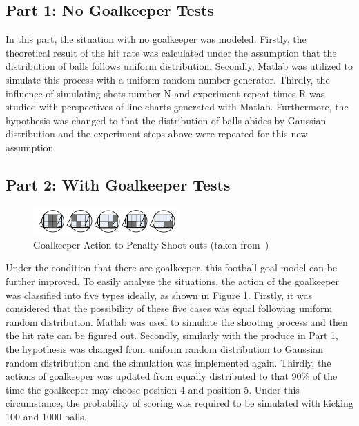 \documentclass[11pt, a4paper]{article}
\begin{document}
\subsection{Part 1: No Goalkeeper Tests}

In this part, the situation with no goalkeeper was modeled. Firstly, the theoretical result of the hit rate was calculated under the assumption that the distribution of balls follows uniform distribution. Secondly, Matlab was utilized to simulate this process with a uniform random number generator. Thirdly, the influence of simulating shots number N and experiment repeat times R was studied with perspectives of line charts generated with Matlab. Furthermore, the hypothesis was changed to that the distribution of balls abides by Gaussian distribution and the experiment steps above were repeated for this new assumption.

\subsection{Part 2: With Goalkeeper Tests}

\begin{figure}[htbp]     \begin{centering}
    \includegraphics[width=0.5\textwidth]{goalkeeper-action.png}
    \caption{Goalkeeper Action to Penalty Shoot-outs (taken from~\cite{ref:lab})}
    \label{Fig:goalkeeper-action}
    \end{centering}
\end{figure}

Under the condition that there are goalkeeper, this football goal model can be further improved. To easily analyse the situations, the action of the goalkeeper was classified into five types ideally, as shown in Figure \ref{Fig:goalkeeper-action}. Firstly, it was considered that the possibility of these five cases was equal following uniform random distribution. Matlab was used to simulate the shooting process and then the hit rate can be figured out. Secondly, similarly with the produce in Part 1, the hypothesis was changed from uniform random distribution to Gaussian random distribution and the simulation was implemented again. Thirdly, the actions of goalkeeper was updated from equally distributed to that 90\% of the time the goalkeeper may choose position 4 and position 5. Under this circumstance, the probability of scoring was required to be simulated with kicking 100 and 1000 balls.
\end{document}
